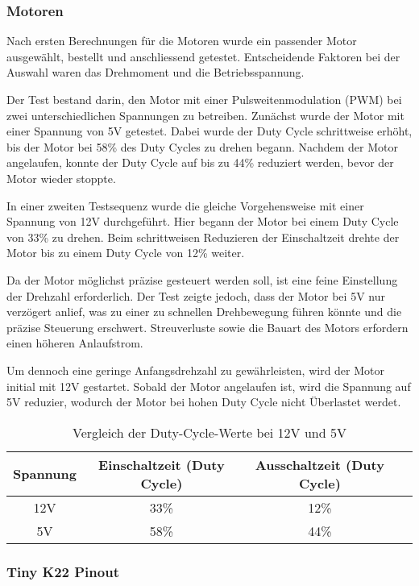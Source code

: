 \subsubsection{Motoren}

Nach ersten Berechnungen für die Motoren wurde ein passender Motor ausgewählt, bestellt und anschliessend getestet. Entscheidende Faktoren bei der Auswahl waren das Drehmoment und die Betriebsspannung.

Der Test bestand darin, den Motor mit einer Pulsweitenmodulation (PWM) bei zwei unterschiedlichen Spannungen zu betreiben. Zunächst wurde der Motor mit einer Spannung von 5V getestet. Dabei wurde der Duty Cycle schrittweise erhöht, bis der Motor bei 58\% des Duty Cycles zu drehen begann. Nachdem der Motor angelaufen, konnte der Duty Cycle auf bis zu 44\% reduziert werden, bevor der Motor wieder stoppte.

In einer zweiten Testsequenz wurde die gleiche Vorgehensweise mit einer Spannung von 12V durchgeführt. Hier begann der Motor bei einem Duty Cycle von 33\% zu drehen. Beim schrittweisen Reduzieren der Einschaltzeit drehte der Motor bis zu einem Duty Cycle von 12\% weiter.

Da der Motor möglichst präzise gesteuert werden soll, ist eine feine Einstellung der Drehzahl erforderlich. Der Test zeigte jedoch, dass der Motor bei 5V nur verzögert anlief, was zu einer zu schnellen Drehbewegung führen könnte und die präzise Steuerung erschwert. Streuverluste sowie die Bauart des Motors erfordern einen höheren Anlaufstrom.

Um dennoch eine geringe Anfangsdrehzahl zu gewährleisten, wird der Motor initial mit 12V gestartet. Sobald der Motor angelaufen ist, wird die Spannung auf 5V reduzier, wodurch der Motor bei hohen Duty Cycle nicht Überlastet werdet.

\begin{table}[h!]
\centering
\begin{tabular}{|c|c|c|c|}
\hline
\textbf{Spannung} & \textbf{Einschaltzeit (Duty Cycle)} & \textbf{Ausschaltzeit (Duty Cycle)} \\ \hline
12V & 33\% & 12\% \\ \hline
5V  & 58\% & 44\% \\ \hline
\end{tabular}
\caption{Vergleich der Duty-Cycle-Werte bei 12V und 5V}
\label{tab:dutycycle}
\end{table}

\subsubsection{Tiny K22 Pinout}

